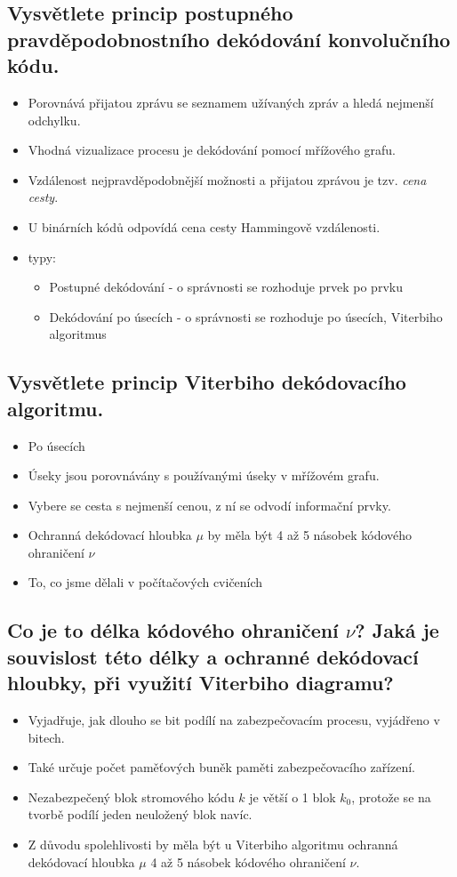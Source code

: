\subsection{Vysvětlete princip postupného pravděpodobnostního dekódování konvolučního kódu.}
\begin{itemize}
    \item Porovnává přijatou zprávu se seznamem užívaných zpráv a hledá nejmenší odchylku.
    \item Vhodná vizualizace procesu je dekódování pomocí mřížového grafu.
    \item Vzdálenost nejpravděpodobnější možnosti a přijatou zprávou je tzv. \textit{cena cesty}.
    \item U binárních kódů odpovídá cena cesty Hammingově vzdálenosti.
    \item typy:
    \begin{itemize}
        \item Postupné dekódování - o správnosti se rozhoduje prvek po prvku
        \item Dekódování po úsecích - o správnosti se rozhoduje po úsecích, Viterbiho algoritmus
    \end{itemize}
\end{itemize}

\subsection{Vysvětlete princip Viterbiho dekódovacího algoritmu.}
\begin{itemize}
    \item Po úsecích
    \item Úseky jsou porovnávány s používanými úseky v mřížovém grafu.
    \item Vybere se cesta s nejmenší cenou, z ní se odvodí informační prvky.
    \item Ochranná dekódovací hloubka $\mu$ by měla být 4 až 5 násobek kódového ohraničení $\nu$
    \item To, co jsme dělali v počítačových cvičeních
\end{itemize}

\subsection{Co je to délka kódového ohraničení $\nu$? Jaká je souvislost této délky a ochranné
dekódovací hloubky, při využití Viterbiho diagramu?} \label{nu}
\begin{itemize}
    \item Vyjadřuje, jak dlouho se bit podílí na zabezpečovacím procesu, vyjádřeno v bitech.
    \item Také určuje počet paměťových buněk paměti zabezpečovacího zařízení.
    \item Nezabezpečený blok stromového kódu $k$ je větší o 1 blok $k_0$, protože se na tvorbě podílí jeden 
    neuložený blok navíc.
    \item Z důvodu spolehlivosti by měla být u Viterbiho algoritmu ochranná dekódovací hloubka $\mu$
    4 až 5 násobek kódového ohraničení $\nu$.
\end{itemize}